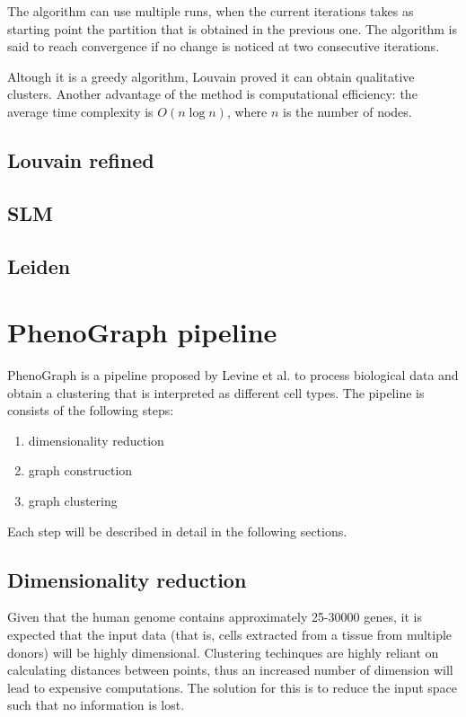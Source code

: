 The algorithm can use multiple runs, when the current iterations takes as starting point the partition that is obtained in the previous one. The algorithm is said to reach convergence if no change is noticed at two consecutive iterations.

Altough it is a greedy algorithm, Louvain proved it can obtain qualitative clusters. Another advantage of the method is computational efficiency: the average time complexity is $O(n \log n)$, where $n$ is the number of nodes.


\subsection{Louvain refined}
\subsection{SLM}
\subsection{Leiden}

\section{PhenoGraph pipeline}
    PhenoGraph \cite{Levine2015} is a pipeline proposed by Levine et al. to process biological data and obtain a clustering that is interpreted as different cell types. The pipeline is consists of the following steps:
    \begin{enumerate}
        \item dimensionality reduction
        \item graph construction
        \item graph clustering
    \end{enumerate}

    Each step will be described in detail in the following sections.

    \subsection{Dimensionality reduction}
    Given that the human genome contains approximately 25-30000 genes, it is expected that the input data (that is, cells extracted from a tissue from multiple donors) will be highly dimensional. Clustering techinques are highly reliant on calculating distances between points, thus an increased number of dimension will lead to expensive computations. The solution for this is to reduce the input space such that no information is lost.
    
